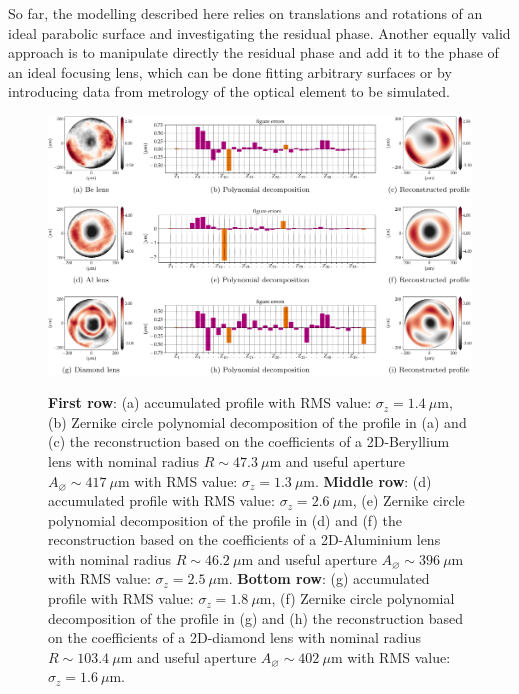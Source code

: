 \begin{refsection}
So far, the modelling described here relies on translations and rotations of an ideal parabolic surface and investigating the residual phase. Another equally valid approach is to manipulate directly the residual phase and add it to the phase of an ideal focusing lens, which can be done fitting arbitrary surfaces or by introducing data from metrology of the optical element to be simulated.

\begin{figure}[t]
        \centering
        {\includegraphics[width=1.\linewidth]{figures/ch04/metrology_zernike_profiles.pdf}}
        \caption[Other sources of deviations from the parabolic shape]{\textbf{First row}: (a) accumulated profile with RMS value: $\sigma_z=1.4~\mu$m, (b) Zernike circle polynomial decomposition of the profile in (a) and (c) the reconstruction based on the coefficients of a 2D-Beryllium lens with nominal radius $R\sim47.3~\mu\text{m}$ and useful aperture $A_{\diameter}\sim417~\mu\text{m}$ with RMS value: $\sigma_z=1.3~\mu$m. \textbf{Middle row}: (d) accumulated profile with RMS value: $\sigma_z=2.6~\mu$m, (e) Zernike circle polynomial decomposition of the profile in (d) and (f) the reconstruction based on the coefficients of a 2D-Aluminium lens with nominal radius $R\sim46.2~\mu\text{m}$ and useful aperture $A_{\diameter}\sim396~\mu\text{m}$ with RMS value: $\sigma_z=2.5~\mu$m. \textbf{Bottom row}: (g) accumulated profile with RMS value: $\sigma_z=1.8~\mu$m, (f) Zernike circle polynomial decomposition of the profile in (g) and (h) the reconstruction based on the coefficients of a 2D-diamond lens with nominal radius $R\sim103.4~\mu\text{m}$ and useful aperture $A_{\diameter}\sim402~\mu\text{m}$ with RMS value: $\sigma_z=1.6~\mu$m.}
        \label{fig:metrology_zernike_profiles}
\end{figure}


\end{refsection}
